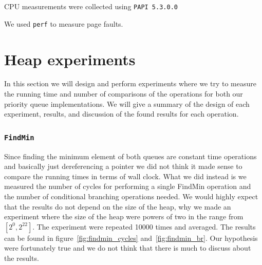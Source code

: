 \documentclass[a4paper,oneside,article,11pt]{memoir}
\begin{document}
CPU measurements were collected using \texttt{PAPI 5.3.0.0}

We used \texttt{perf} to measure page faults.

\chapter{Heap experiments}
\label{heap_experiments}
In this section we will design and perform experiments where we try to measure the running time and number of comparisons of the operations for both our priority queue implementations. We will give a summary of the design of each experiment, results, and discussion of the found results for each operation.

\subsection{\texttt{FindMin}}
Since finding the minimum element of both queues are constant time operations and basically just dereferencing a pointer we did not think it made sense to compare the running times in terms of wall clock. What we did instead is we measured the number of cycles for performing a single FindMin operation and the number of conditional branching operations needed. We would highly expect that the results do not depend on the size of the heap, why we made an experiment where the size of the heap were powers of two in the range from $\left[2^0, 2^{22}\right]$. The experiment were repeated 10000 times and averaged. The results can be found in figure~\ref{fig:findmin_cycles} and~\ref{fig:findmin_br}.
Our hypothesis were fortunately true and we do not think that there is much to discuss about the results.
\end{document}
